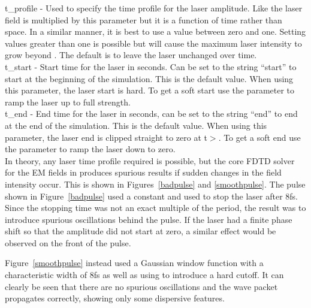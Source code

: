 {\emphtext t\_profile} - Used to specify the time profile for the laser
amplitude. Like  the laser field is multiplied by
this parameter but it is a function of time rather than space. In a similar
manner, it is best to use a value between zero and one.
Setting values greater than one is possible but will cause the maximum laser
intensity to grow beyond . The default is to leave the
laser unchanged over time.\\

{\emphtext t\_start} - Start time for the laser in seconds. Can be set to the
string ``start'' to start at the beginning of the simulation. This is the
default value. When using this parameter, the laser start is hard. To get a
soft start use the  parameter to ramp the laser up to
full strength.\\

{\emphtext t\_end} - End time for the laser in seconds, can be set to the
string ``end'' to end at the end of the simulation. This is the default value.
When using this parameter, the laser end is clipped straight to zero at
t$>$. To get a soft end use the 
parameter to ramp the laser down to zero.\\

In theory, any laser time profile required is possible, but the core FDTD
solver for the EM fields in {\EPOCH} produces spurious results if sudden
changes in the field intensity occur. This is shown in Figures~\ref{badpulse}
and \ref{smoothpulse}. The pulse shown in Figure~\ref{badpulse} used a constant
 and used  to stop the laser after
8fs. Since the stopping time was not an exact multiple of the period, the
result was to introduce spurious oscillations behind the pulse. If the laser
had a finite phase shift so that the amplitude did not start at zero, a
similar effect would be observed on the front of the pulse.


Figure~\ref{smoothpulse} instead used a Gaussian window function with a
characteristic width of 8fs as well as using  to introduce
a hard cutoff. It can clearly be seen that there are no spurious oscillations
and the wave packet propagates correctly, showing only some dispersive
features.

